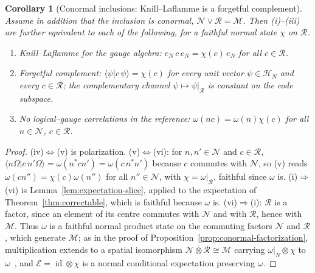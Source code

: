 \documentclass[a4paper,11pt]{article}
\newtheorem{corollary}[theorem]{Corollary}
\theoremstyle{definition}
\newcommand{\mE}{\mathcal{E}}
\begin{document}
\begin{corollary}[Conormal inclusions: Knill--Laflamme is a forgetful complement]\label{cor:KL-conormal}
Assume in addition that the inclusion is conormal, $\mathcal N\vee\mathcal R=\mathcal M$. Then {\rm(i)--(iii)} are further equivalent to each of the following, for a faithful normal state $\chi$ on $\mathcal R$.
\begin{enumerate}
 \item[\rm(iv)] \emph{Knill--Laflamme for the gauge algebra:} $e_N\,c\,e_N=\chi(c)\,e_N$ for all $c\in\mathcal R$.
 \item[\rm(v)] \emph{Forgetful complement:} $\langle\psi|c\,\psi\rangle=\chi(c)$ for every unit vector $\psi\in\mathcal H_N$ and every $c\in\mathcal R$; the complementary channel $\psi\mapsto\psi|_{\mathcal R}$ is constant on the code subspace.
 \item[\rm(vi)] \emph{No logical--gauge correlations in the reference:} $\omega(nc)=\omega(n)\chi(c)$ for all $n\in\mathcal N$, $c\in\mathcal R$.
\end{enumerate}
\end{corollary}

\begin{proof}
(iv)$\Leftrightarrow$(v) is polarization. (v)$\Leftrightarrow$(vi): for $n,n'\in\mathcal N$ and $c\in\mathcal R$, $\langle n\Omega|c\,n'\Omega\rangle=\omega(n^*cn')=\omega(c\,n^*n')$ because $c$ commutes with $\mathcal N$, so (v) reads $\omega(cn'')=\chi(c)\omega(n'')$ for all $n''\in\mathcal N$, with $\chi=\omega|_{\mathcal R}$, faithful since $\omega$ is. (i)$\Rightarrow$(vi) is Lemma~\ref{lem:expectation-slice}, applied to the expectation of Theorem~\ref{thm:correctable}, which is faithful because $\omega$ is. (vi)$\Rightarrow$(i): $\mathcal R$ is a factor, since an element of its centre commutes with $\mathcal N$ and with $\mathcal R$, hence with $\mathcal M$. Thus $\omega$ is a faithful normal product state on the commuting factors $\mathcal N$ and $\mathcal R$, which generate $\mathcal M$; as in the proof of Proposition~\ref{prop:conormal-factorization}, multiplication extends to a spatial isomorphism $\mathcal N\overline\otimes\mathcal R\cong\mathcal M$ carrying $\omega|_N\otimes\chi$ to $\omega$~\cite{DoplicherLongo1984}, and $\mE=\operatorname{id}\otimes\chi$ is a normal conditional expectation preserving $\omega$.
\end{proof}
\end{document}
